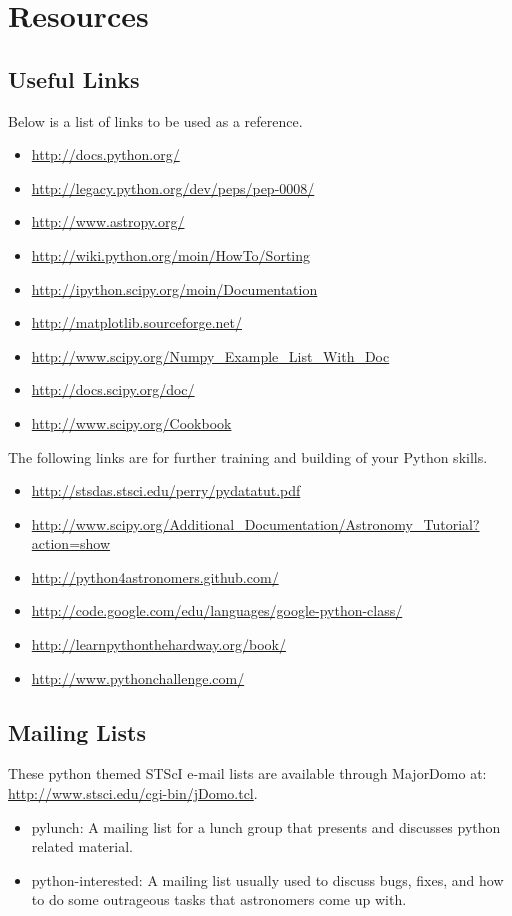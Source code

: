\chapter{Resources}
\label{ch:links}
 
\section{Useful Links }
Below is a list of links to be used as a reference.
\begin{itemize}
\item \url{http://docs.python.org/}
\item \url{http://legacy.python.org/dev/peps/pep-0008/}
\item \url{http://www.astropy.org/}
\item \url{http://wiki.python.org/moin/HowTo/Sorting}
\item \url{http://ipython.scipy.org/moin/Documentation}
\item \url{http://matplotlib.sourceforge.net/}
\item \url{http://www.scipy.org/Numpy\_Example\_List\_With\_Doc}
\item \url{http://docs.scipy.org/doc/}
\item \url{http://www.scipy.org/Cookbook}
\end{itemize}

The following links are for further training and building of your
Python skills.
\begin{itemize}
\item \url{http://stsdas.stsci.edu/perry/pydatatut.pdf}
\item \url{http://www.scipy.org/Additional_Documentation/Astronomy_Tutorial?action=show}
\item \url{http://python4astronomers.github.com/} 
\item \url{http://code.google.com/edu/languages/google-python-class/}
\item \url{http://learnpythonthehardway.org/book/}
\item \url{http://www.pythonchallenge.com/}
\end{itemize}

\section{Mailing Lists}
These python themed STScI e-mail lists are available through MajorDomo
at: \\
\url{http://www.stsci.edu/cgi-bin/jDomo.tcl}.  
\begin{itemize}
\item pylunch: A mailing list for a lunch group that presents and
  discusses python related material.
\item python-interested: A mailing list usually used to discuss bugs,
  fixes, and how to do some outrageous tasks that astronomers come up
  with.
\end{itemize}